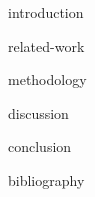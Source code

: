 \documentclass[cic,tc,english,nominata]{resources/documentclass/iiufrgs}
\begin{document}

\tableofcontents


{introduction}


{related-work}


{methodology}


{discussion}


{conclusion}


{bibliography}

\end{document}
